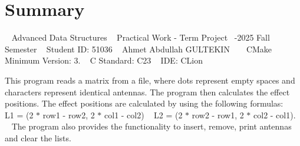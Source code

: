 \chapter{Summary}
\hypertarget{index}{}\label{index}
~\newline
Advanced Data Structures ~\newline
Practical Work -\/ Term Project ~-\/2025 Fall Semester ~\newline
Student ID\+: 51036 ~\newline
Ahmet Abdullah GULTEKIN ~\newline
 ~\newline
CMake Minimum Version\+: 3. ~\newline
C Standard\+: C23 ~\newline
IDE\+: CLion ~\newline
 ~\newline


This program reads a matrix from a file, where dots represent empty spaces and characters represent identical antennas. The program then calculates the effect positions. The effect positions are calculated by using the following formulas\+: ~\newline
L1 = (2 \texorpdfstring{$\ast$}{*} row1 -\/ row2, 2 \texorpdfstring{$\ast$}{*} col1 -\/ col2) ~\newline
L2 = (2 \texorpdfstring{$\ast$}{*} row2 -\/ row1, 2 \texorpdfstring{$\ast$}{*} col2 -\/ col1). ~\newline
The program also provides the functionality to insert, remove, print antennas and clear the lists. 